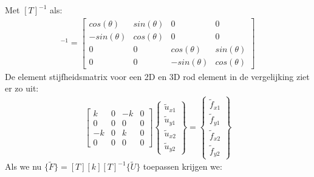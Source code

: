 \documentclass[a4paper,11pt,twoside]{report}
\begin{document}
Met $[T]^{-1}$ als:
\begin{align*}
    [T]^{-1} =
    \begin{bmatrix}
        cos(\theta)  & sin(\theta) & 0            & 0           \\
        -sin(\theta) & cos(\theta) & 0            & 0           \\
        0            & 0           & cos(\theta)  & sin(\theta) \\
        0            & 0           & -sin(\theta) & cos(\theta)
    \end{bmatrix}
\end{align*}
De element stijfheidsmatrix voor een 2D en 3D rod element in de vergelijking ziet er zo uit:
\begin{align*}
    \begin{bmatrix}
        k  & 0 & -k & 0 \\
        0  & 0 & 0  & 0 \\
        -k & 0 & k  & 0 \\
        0  & 0 & 0  & 0
    \end{bmatrix}
    \begin{Bmatrix}
        \tilde{u}_{x1} \\
        \tilde{u}_{y1} \\
        \tilde{u}_{x2} \\
        \tilde{u}_{y2}
    \end{Bmatrix}
    =
    \begin{Bmatrix}
        \tilde{f}_{x1} \\
        \tilde{f}_{y1} \\
        \tilde{f}_{x2} \\
        \tilde{f}_{y2}
    \end{Bmatrix}
\end{align*}
Als we nu $\{\tilde{F}\} = [T] [k] [T]^{-1} \{\tilde{U}\}$ toepassen krijgen we:
\end{document}
